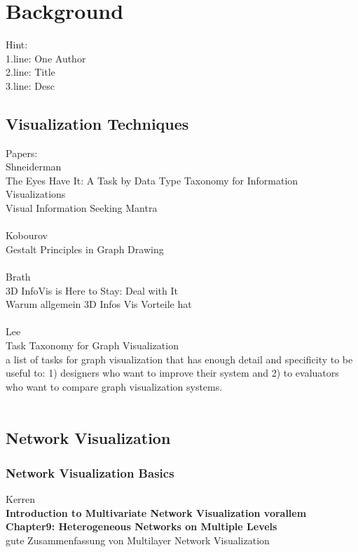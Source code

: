 \chapter{Background}
Hint:\\
1.line: One Author \\
2.line: Title \\
3.line: Desc\\
\section{Visualization Techniques}
Papers:\\

Shneiderman\\
The Eyes Have It: A Task by Data Type Taxonomy for Information Visualizations\\
Visual Information Seeking Mantra\\
\\
Kobourov\\
Gestalt Principles in Graph Drawing\\
\\
Brath \\
3D InfoVis is Here to Stay: Deal with It\\
Warum allgemein 3D Infos Vis Vorteile hat\\
\\
Lee\\
Task Taxonomy for Graph Visualization\\
a list of tasks for graph visualization that has
enough detail and specificity to be useful to: 1) designers who
want to improve their system and 2) to evaluators who want to
compare graph visualization systems.\\
\\

\section{Network Visualization}

\subsection{Network Visualization Basics}

Kerren\\
\textbf{Introduction to Multivariate Network Visualization vorallem Chapter9: Heterogeneous Networks on Multiple Levels} \\
gute Zusammenfassung von Multilayer Network Visualization\\

